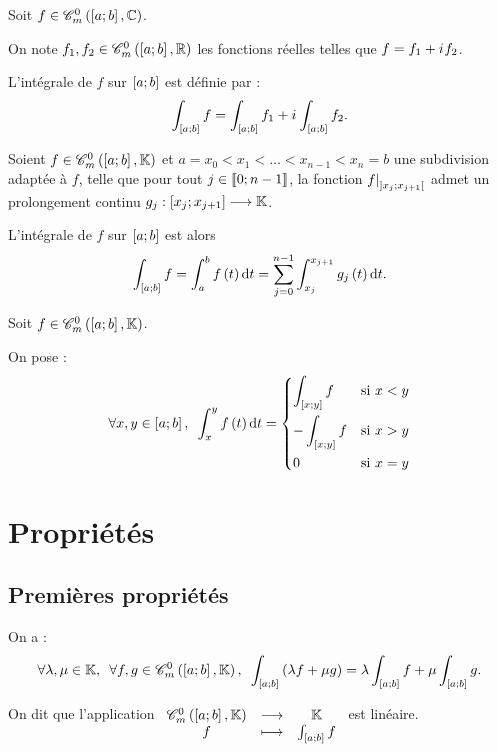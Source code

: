 \begin{defi}
Soit \(f\in\contm[\intervii{a}{b}][\C]\).

On note \(f_1,f_2\in\contm[\intervii{a}{b}][\R]\) les fonctions réelles telles que \(f=f_1+i\mkern1mu f_2\).

L'intégrale de \(f\) sur \(\left[a;b\right]\) est définie par : \[\int_{\left[a;b\right]}f=\int_{\left[a;b\right]}f_1+i\mkern1mu\int_{\left[a;b\right]}f_2.\]
\end{defi}

\begin{rem}
Soient \(f\in\contm\) et \(a=x_0<x_1<\dots<x_{n-1}<x_n=b\) une subdivision adaptée à \(f\), \cad telle que pour tout \(j\in\left\llbracket0;n-1\right\rrbracket\), la fonction \(\restr{f}{\intervee{x_j}{x_{j+1}}}\) admet un prolongement continu \(g_j:\left[x_j;x_{j+1}\right]\longrightarrow\mathbb{K}\).

L'intégrale de \(f\) sur \(\left[a;b\right]\) est alors \[\int_{\intervii{a}{b}}f=\int_a^bf\paren{t}\odif{t}=\sum_{j=0}^{n-1}\int_{x_j}^{x_{j+1}}g_j\paren{t}\odif{t}.\]
\end{rem}

\begin{nota}[Généralisation]
Soit \(f\in\contm\).

On pose : \[\quantifs{\forall x,y\in\intervii{a}{b}}\int_x^yf\paren{t}\odif{t}=\begin{dcases}\int_{\intervii{x}{y}}f &\text{si }x<y \\ -\int_{\intervii{x}{y}}f &\text{si }x>y \\ 0 &\text{si }x=y\end{dcases}\]
\end{nota}

\section{Propriétés}

\subsection{Premières propriétés}

\begin{prop}
On a : \[\quantifs{\forall\lambda,\mu\in\K;\forall f,g\in\contm}\int_{\intervii{a}{b}}\paren{\lambda f+\mu g}=\lambda\int_{\intervii{a}{b}}f+\mu\int_{\intervii{a}{b}}g.\]

On dit que l'application \(\fonctionlambda{\contm}{\K}{f}{\int_{\intervii{a}{b}}f}\) est linéaire.
\end{prop}

